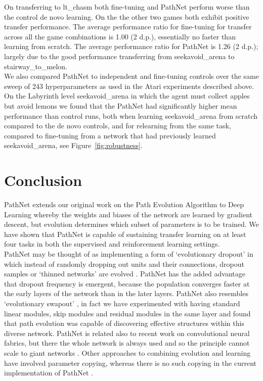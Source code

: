 \documentclass{sig-alternate-05-2015}
\begin{document}
On transferring to lt\_chasm both fine-tuning and PathNet perform worse than the control de novo learning. On the the other two games both exhibit positive transfer performance. The average performance ratio for fine-tuning for transfer across all the game combinations is 1.00 (2 d.p.), essentially no faster than learning from scratch. The average performance ratio for PathNet is 1.26 (2 d.p.); largely due to the good performance transferring from seekavoid\_arena to stairway\_to\_melon.\\

We also compared PathNet to independent and fine-tuning controls over the same sweep of 243 hyperparameters as used in the Atari experiments described above. On the Labyrinth level seekavoid\_arena in which the agent must collect apples but avoid lemons we found that the PathNet had significantly higher mean performance than control runs, both when learning seekavoid\_arena from scratch compared to the de novo controls, and for relearning from the same task, compared to fine-tuning from a network that had previously learned seekavoid\_arena, see Figure~\ref{fig:robustness}. \\


\section{Conclusion} 
PathNet extends our original work on the Path Evolution Algorithm \cite{fernando2011evolvable} to Deep Learning whereby the weights and biases of the network are learned by gradient descent, but evolution determines which subset of parameters is to be trained. We have shown that PathNet is capable of sustaining transfer learning on at least four tasks in both the supervised and reinforcement learning settings.\\

PathNet may be thought of as implementing a form of `evolutionary dropout' in which instead of randomly dropping out units and their connections, dropout samples or `thinned networks' are evolved \cite{srivastava2014dropout}. PathNet has the added advantage that dropout frequency is emergent, because the population converges faster at the early layers of the network than in the later layers. PathNet also resembles `evolutionary swapout' \cite{singh2016swapout}, in fact we have experimented with having standard linear modules, skip modules and residual modules in the same layer and found that path evolution was capable of discovering effective structures within this diverse network. PathNet is related also to recent work on convolutional neural fabrics,  but there the whole network is always used and so the principle cannot scale to giant networks \cite{saxena2016convolutional}. Other approaches to combining evolution and learning have involved parameter copying, whereas there is no such copying in the current implementation of PathNet \cite{auerbach2014online}\cite{chen2015net2net}. \\
\end{document}
